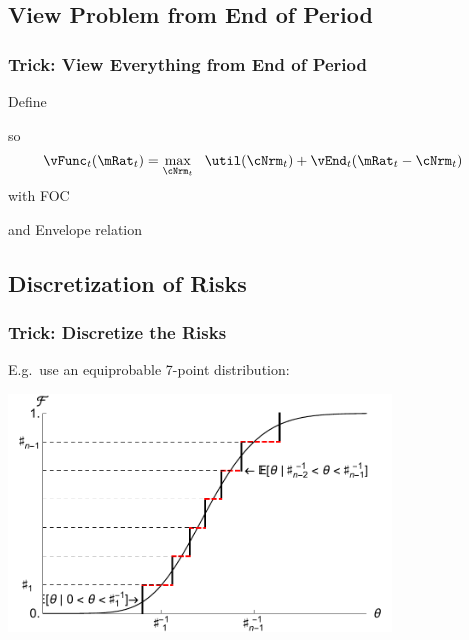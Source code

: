 \documentclass{beamer}
\begin{document}
\subsection{View Problem from End of Period}

\begin{frame}[label=Normalize]
\frametitle{Trick: View Everything from End of Period}

Define 

so 
\begin{equation}\begin{gathered}\begin{aligned}
  \vFunc_{t}(\mRat_{t})  & = \max_{\cNrm_{t}}~~ \util(\cNrm_{t}) + \vEnd_{t}(\mRat_{t}-\cNrm_{t})
\end{aligned}\end{gathered}\end{equation}
with FOC

and Envelope relation


\end{frame}


\subsection{Discretization of Risks}
\begin{frame}[label=DiscretizeFig]
\frametitle{Trick: Discretize the Risks}

E.g.\ use an equiprobable 7-point distribution:\medskip\medskip

\includegraphics[width=4in]{./Figures/discreteApprox.pdf}

\end{frame}
\end{document}
